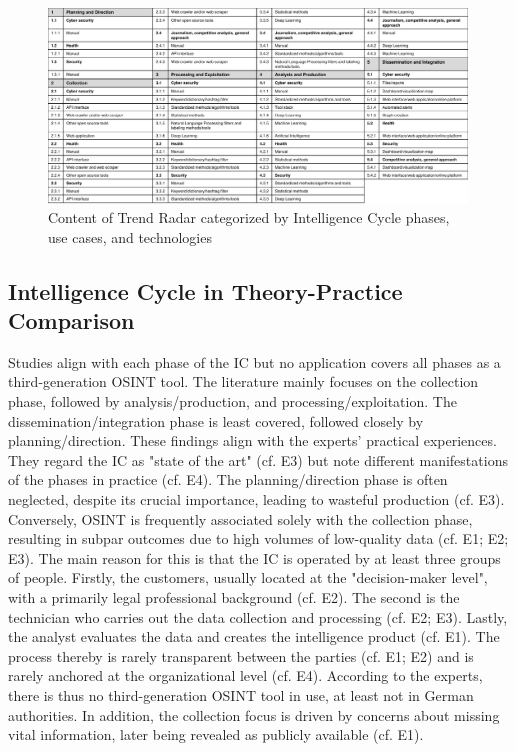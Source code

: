 \documentclass[10pt]{article}
\begin{document}
\begin{figure}[thb]
    \centering
    \includegraphics[width=0.99\textwidth]{PDF/images/crop_Trendradar explanation}
    \caption{Content of Trend Radar categorized by Intelligence Cycle phases, use cases, and technologies}
    \label{fig:trendradarexplanation}
\end{figure}

\subsection{Intelligence Cycle in Theory-Practice Comparison} \label{sec:intcomp}

Studies align with each phase of the IC but no application covers all phases as a third-generation OSINT tool. The literature mainly focuses on the collection phase, followed by analysis/production, and processing/exploitation. The dissemination/integration phase is least covered, followed closely by planning/direction.
These findings align with the experts' practical experiences. They regard the IC as "state of the art" (cf. E3) but note different manifestations of the phases in practice (cf. E4).
The planning/direction phase is often neglected, despite its crucial importance, leading to wasteful production (cf. E3). Conversely, OSINT is frequently associated solely with the collection phase,
resulting in subpar outcomes due to high volumes of low-quality data (cf. E1; E2; E3). The main reason for this is that the IC is operated by at least three groups of people. Firstly, the customers, usually located at the "decision-maker level", with a primarily legal professional background (cf. E2).
The second is the technician who carries out the data collection and processing (cf. E2; E3). Lastly, the analyst evaluates the data and creates the intelligence product (cf. E1). The process thereby is rarely transparent between the parties
(cf. E1; E2) and is rarely anchored at the organizational level (cf. E4). According to the experts, there is thus no third-generation
OSINT tool in use, at least not in German authorities. In addition, the collection focus is driven by concerns about missing vital information, later being revealed as publicly available (cf. E1).
\end{document}
